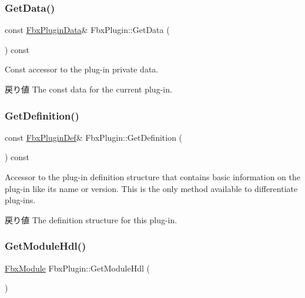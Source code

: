 \subsubsection{\texorpdfstring{Get\+Data()}{GetData()}\hspace{0.1cm}{\footnotesize\ttfamily [2/2]}}
{\footnotesize\ttfamily const \hyperlink{struct_fbx_plugin_data}{Fbx\+Plugin\+Data}\& Fbx\+Plugin\+::\+Get\+Data (\begin{DoxyParamCaption}{ }\end{DoxyParamCaption}) const\hspace{0.3cm}{\ttfamily [protected]}}

Const accessor to the plug-\/in private data. \begin{DoxyReturn}{戻り値}
The const data for the current plug-\/in. 
\end{DoxyReturn}
\mbox{\label{class_fbx_plugin_a2827e6fbb16ac3c80a2e9a50c34201c5}} 
\subsubsection{\texorpdfstring{Get\+Definition()}{GetDefinition()}}
{\footnotesize\ttfamily const \hyperlink{struct_fbx_plugin_def}{Fbx\+Plugin\+Def}\& Fbx\+Plugin\+::\+Get\+Definition (\begin{DoxyParamCaption}{ }\end{DoxyParamCaption}) const}

Accessor to the plug-\/in definition structure that contains basic information on the plug-\/in like its name or version. This is the only method available to differentiate plug-\/ins. \begin{DoxyReturn}{戻り値}
The definition structure for this plug-\/in. 
\end{DoxyReturn}
\mbox{\label{class_fbx_plugin_ae50021560acfbc6a4d924cae16d5414b}} 
\subsubsection{\texorpdfstring{Get\+Module\+Hdl()}{GetModuleHdl()}}
{\footnotesize\ttfamily \hyperlink{fbxmodule_8h_a1d2ed3e9ccb8075d585f7cb7bdf40420}{Fbx\+Module} Fbx\+Plugin\+::\+Get\+Module\+Hdl (\begin{DoxyParamCaption}{ }\end{DoxyParamCaption})}

